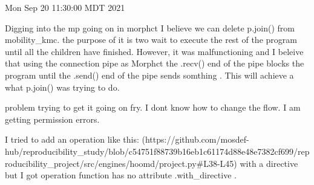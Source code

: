 Mon Sep 20 11:30:00 MDT 2021
    
    Digging into the mp going on in morphct I believe we can delete p.join() from 
    mobility_kmc. the purpose of it is two wait to execute the rest of the program
    until all the children have finished. However, it was malfunctioning and I beleive
    that using the connection pipe as Morphct the .recv() end of the pipe blocks the
    program until the .send() end of the pipe sends somthing . This will achieve 
    a what p.join() was trying to do. 

    problem trying to get it going on fry. I dont know how to change the flow. 
    I am getting permission errors. 

    I tried to add an operation like this: 
    (https://github.com/mosdef-hub/reproducibility_study/blob/c54751f88739b16eb1c61174d88e48e7382cf699/reproducibility_project/src/engines/hoomd/project.py#L38-L45)
    with a directive but I got operation function has no
    attribute .with_directive .

